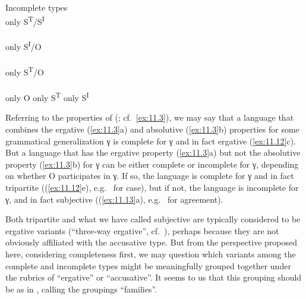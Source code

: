 \documentclass[output=paper]{langsci/langscibook}
\begin{document}
\ea%
    \label{ex:11.13}Incomplete types\\
    \ea only S\textsuperscript{T}/S\textsuperscript{I}
         \\
         \\
         
	\ex only S\textsuperscript{I}/O
         \\
         \\
         
	\ex only S\textsuperscript{T}/O
         \\
         \\
         
    \ex only O                    \tab{} 
    \ex only S\textsuperscript{T} \tab{} 
    \ex only S\textsuperscript{I} \tab{} 
	\z
\z

Referring to the  properties of \citeauthor{Deal2015}
(\citeyear{Deal2015}; cf.\ \eqref{ex:11.3}), we may say that a language
that combines the ergative (\ref{ex:11.3}a) and absolutive
(\ref{ex:11.3}b) properties for some grammatical generalization γ is
complete for γ and in fact ergative (\ref{ex:11.12}c).  But a language that
has the ergative property (\ref{ex:11.3}a) but not the absolutive property
(\ref{ex:11.3}b) for γ can be either complete or incomplete for γ,
depending on whether O participates in γ. If so, the language is complete for γ
and in fact tripartite ((\ref{ex:11.12}e), e.g.\  for case),
but if not, the language is incomplete for γ, and in fact subjective
((\ref{ex:11.13}a), e.g.\  for agreement).

Both tripartite and what we have called subjective are typically considered to
be ergative variants (\enquote{three-way ergative}, cf.\ \citealt{Deal2015}),
perhaps because they are not obviously affiliated with the accusative type. But
from the perspective proposed here, considering completeness first, we may
question which variants among the complete and incomplete types might be
meaningfully grouped together under the rubrics of \enquote{ergative} or
\enquote{accusative}.  It seems to us that this grouping should be as in ,
calling the groupings \enquote{families}.
\end{document}
